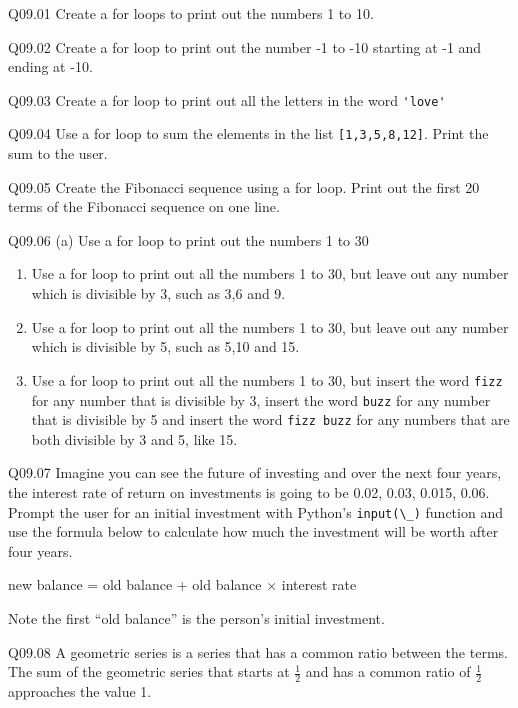 \documentclass{book}
\newenvironment{problems}{}{}  %
\newcommand{\passthrough}[1]{#1}
\begin{document}
    
        \begin{problems}
        Q09.01 Create a for loops to print out the numbers 1 to 10.

Q09.02 Create a for loop to print out the number -1 to -10 starting at
-1 and ending at -10.

Q09.03 Create a for loop to print out all the letters in the word
\passthrough{\lstinline!'love'!}

Q09.04 Use a for loop to sum the elements in the list
\passthrough{\lstinline![1,3,5,8,12]!}. Print the sum to the user.

Q09.05 Create the Fibonacci sequence using a for loop. Print out the
first 20 terms of the Fibonacci sequence on one line.

Q09.06 (a) Use a for loop to print out the numbers 1 to 30

\begin{enumerate}
\def\labelenumi{(\alph{enumi})}
\setcounter{enumi}{1}
\item
  Use a for loop to print out all the numbers 1 to 30, but leave out any
  number which is divisible by 3, such as 3,6 and 9.
\item
  Use a for loop to print out all the numbers 1 to 30, but leave out any
  number which is divisible by 5, such as 5,10 and 15.
\item
  Use a for loop to print out all the numbers 1 to 30, but insert the
  word \passthrough{\lstinline!fizz!} for any number that is divisible
  by 3, insert the word \passthrough{\lstinline!buzz!} for any number
  that is divisible by 5 and insert the word
  \passthrough{\lstinline!fizz buzz!} for any numbers that are both
  divisible by 3 and 5, like 15.
\end{enumerate}

Q09.07 Imagine you can see the future of investing and over the next
four years, the interest rate of return on investments is going to be
0.02, 0.03, 0.015, 0.06. Prompt the user for an initial investment with
Python's \passthrough{\lstinline!input(\_)!} function and use the
formula below to calculate how much the investment will be worth after
four years.

new balance = old balance + old balance \(\times\) interest rate

Note the first ``old balance'' is the person's initial investment.

Q09.08 A geometric series is a series that has a common ratio between
the terms. The sum of the geometric series that starts at
\(\frac{1}{2}\) and has a common ratio of \(\frac{1}{2}\) approaches the
value 1.


\end{problems}
\end{document}
